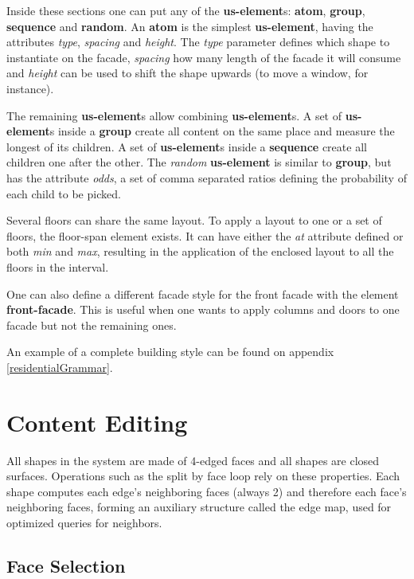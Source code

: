 Inside these sections one can put any of the \textbf{us-element}s: \textbf{atom}, \textbf{group}, \textbf{sequence} and \textbf{random}.
An \textbf{atom} is the simplest \textbf{us-element}, having the attributes
\emph{type}, \emph{spacing} and \emph{height}.
The \emph{type} parameter defines which shape to instantiate on the facade,
\emph{spacing} how many length of the facade it will consume and
\emph{height} can be used to shift the shape upwards (to move a window, for instance).

The remaining \textbf{us-element}s allow combining \textbf{us-element}s.
A set of \textbf{us-element}s inside a \textbf{group} create all content on the same place and measure the longest of its children.
A set of \textbf{us-element}s inside a \textbf{sequence} create all children one after the other.
The \emph{random} \textbf{us-element} is similar to \textbf{group}, but has the attribute \emph{odds},
a set of comma separated ratios defining the probability of each child to be picked.

Several floors can share the same layout. To apply a layout to one or a set of floors, the floor-span element exists.
It can have either the \emph{at} attribute defined or both \emph{min} and \emph{max},
resulting in the application of the enclosed layout to all the floors in the interval.

One can also define a different facade style for the front facade with the element \textbf{front-facade}.
This is useful when one wants to apply columns and doors to one facade but not the remaining ones.


An example of a complete building style can be found on appendix \ref{residentialGrammar}.


\section{Content Editing}

All shapes in the system are made of 4-edged faces and all shapes are closed surfaces.
Operations such as the split by face loop rely on these properties.
Each shape computes each edge's neighboring faces (always 2)
and therefore each face's neighboring faces, forming an auxiliary structure called the edge map,
used for optimized queries for neighbors.


\subsection{Face Selection}

